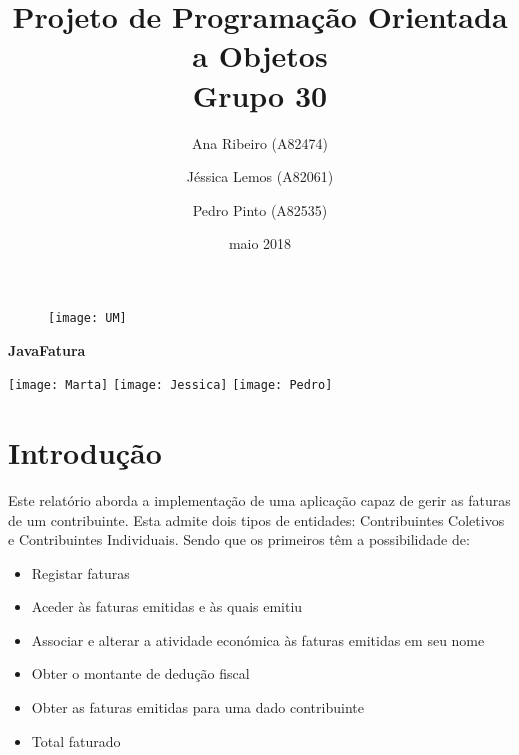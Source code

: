 \documentclass[10pt,a4paper]{article}
\begin{document}
\title{\bf{\textcolor{Mahogany}{Projeto de Programação Orientada a Objetos}\\ \huge Grupo 30}}

\graphicspath{ {/home/jessica/Desktop/} }
\begin{figure}[t]
    \centering
	\center\texttt{[image: UM]}\\
\end{figure}
\date{maio 2018}
\maketitle
\begin{center}
{\bf{\Huge{JavaFatura}}}

\graphicspath{ {/home/jessica/Desktop/} }
\vspace{6cm}

	\texttt{[image: Marta]}  \qquad \qquad \quad
	\texttt{[image: Jessica]} \qquad \qquad \quad
	\texttt{[image: Pedro]} \qquad 
\end{center}
\begin{center}
\author{ Ana Ribeiro (A82474) \and \qquad Jéssica Lemos (A82061) \and \qquad Pedro Pinto (A82535)}
\end{center}

\thispagestyle{empty}
\cleardoublepage

\thispagestyle{empty}
\tableofcontents
\cleardoublepage
{}
\setcounter {page}{1}

\section{Introdução}

Este relatório aborda a implementação de uma aplicação capaz de gerir as faturas de um contribuinte. Esta admite dois tipos de entidades: Contribuintes Coletivos e Contribuintes Individuais. Sendo que os primeiros têm a possibilidade de: 

\begin{itemize}
 \item Registar faturas
 \item Aceder às faturas emitidas e às quais emitiu
 \item Associar e alterar a atividade económica às faturas emitidas em seu nome
 \item Obter o montante de dedução fiscal
 \item Obter as faturas emitidas para uma dado contribuinte
 \item Total faturado
\end{itemize}
\end{document}
